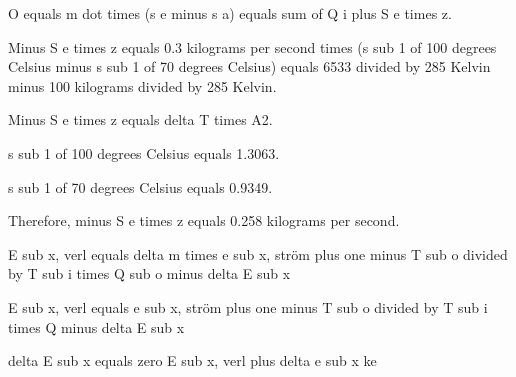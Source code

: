 O equals m dot times (s e minus s a) equals sum of Q i plus S e times z.

Minus S e times z equals 0.3 kilograms per second times (s sub 1 of 100 degrees Celsius minus s sub 1 of 70 degrees Celsius) equals 6533 divided by 285 Kelvin minus 100 kilograms divided by 285 Kelvin.

Minus S e times z equals delta T times A2.

s sub 1 of 100 degrees Celsius equals 1.3063.

s sub 1 of 70 degrees Celsius equals 0.9349.

Therefore, minus S e times z equals 0.258 kilograms per second.

E sub x, verl equals delta m times e sub x, ström plus one minus T sub o divided by T sub i times Q sub o minus delta E sub x

E sub x, verl equals e sub x, ström plus one minus T sub o divided by T sub i times Q minus delta E sub x

delta E sub x equals zero E sub x, verl plus delta e sub x ke